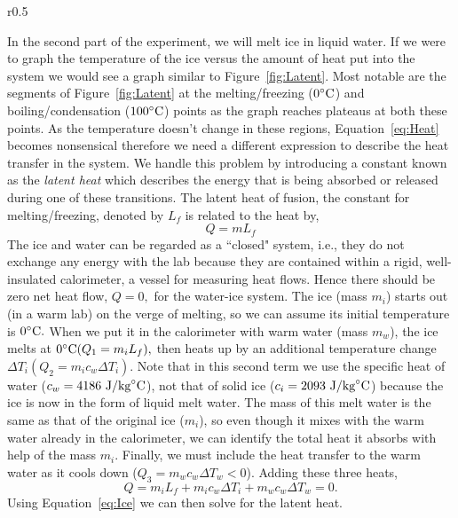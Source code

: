 \documentclass[main.tex]{subfiles}
\begin{document}
\begin{wrapfigure}{r}{0.5\textwidth}
\centering
{}
\caption{} \label{fig:Latent}
\end{wrapfigure}
In the second part of the experiment, we will melt ice in liquid water. If we were to graph the temperature of the ice versus the amount of heat put into the system we would see a graph similar to Figure~\ref{fig:Latent}. Most notable are the segments of Figure~\ref{fig:Latent} at the melting/freezing ($0\celsius$) and boiling/condensation ($100\celsius$) points as the graph reaches plateaus at both these points. As the temperature doesn't change in these regions, Equation~\eqref{eq:Heat} becomes nonsensical therefore we need a different expression to describe the heat transfer in the system. We handle this problem by introducing a constant known as the \emph{latent heat} which describes the energy that is being absorbed or released during one of these transitions. The latent heat of fusion, the constant for melting/freezing, denoted by $L_f$ is related to the heat by,
\begin{equation}
Q=mL_f
\end{equation}
The ice and water can be regarded as a ``closed" system, i.e., they do not exchange any energy with the lab because they are contained within a rigid, well-insulated calorimeter, a vessel for measuring heat flows. Hence there should be zero net heat flow, $Q=0,$ for the water-ice system. The ice (mass $m_i$) starts out (in a warm lab) on the verge of melting, so we can assume its initial temperature is $0\celsius.$ When we put it in the calorimeter with warm water (mass $m_w$), the ice melts at $0\celsius (Q_1=m_i L_f),$ then heats up by an additional temperature change $\Delta T_i (Q_2=m_i c_w \Delta T_i).$ Note that in this second term we use the specific heat of water ($c_w=4186 \text{ J}/\text{kg}\celsius$), not that of solid ice ($c_i=2093 \text{ J}/\text{kg}\celsius$) because the ice is now in the form of liquid melt water. The mass of this melt water is the same as that of the original ice ($m_i$), so even though it mixes with the warm water already in the calorimeter, we can identify the total heat it absorbs with help of the mass $m_i.$ Finally, we must include the heat transfer to the warm water as it cools down ($Q_3=m_w c_w \Delta T_w<0$). Adding these three heats,
\begin{equation} \label{eq:Ice}
Q=m_i L_f+m_i c_w \Delta T_i+m_w c_w \Delta T_w=0.
\end{equation}
Using Equation~\eqref{eq:Ice} we can then solve for the latent heat.
\end{document}
